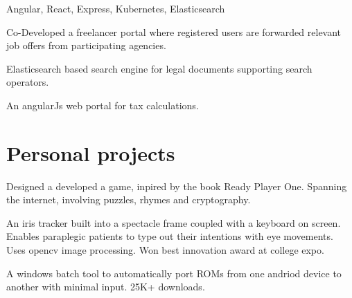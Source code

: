 \documentclass[]{font}
\begin{document}
\begin{minipage}[t]{0.66\textwidth}
Angular, React, Express, Kubernetes, Elasticsearch
\begin{tightemize}
\item Co-Developed a freelancer portal where registered users are forwarded relevant job offers from participating agencies. 
\item Elasticsearch based search engine for legal documents supporting search operators.
\item An angularJs web portal for tax calculations.
\end{tightemize}    


\sectionsep



\section{Personal projects}

Designed a developed a game, inpired by the book Ready Player One. Spanning the internet, involving puzzles, rhymes and cryptography.
\sectionsep

An iris tracker built into a spectacle frame coupled with a keyboard on screen. Enables paraplegic patients to type out their intentions with eye movements. Uses opencv image processing. Won best innovation award at college expo.
\sectionsep

A windows batch tool to automatically port ROMs from one andriod device to another with minimal input. 25K+ downloads.
\sectionsep

\end{minipage} 
\end{document}
